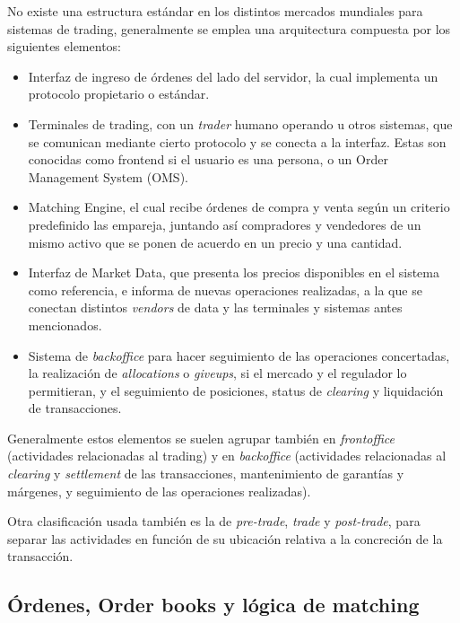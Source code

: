 No existe una estructura estándar en los distintos mercados mundiales para
sistemas de trading, generalmente se emplea una arquitectura compuesta por los
siguientes elementos:
\begin{itemize}
 \item Interfaz de ingreso de órdenes del lado del servidor, la cual implementa
un protocolo propietario o estándar.
 \item Terminales de trading, con un \emph{trader} humano operando u otros
sistemas, que se comunican mediante cierto protocolo y se conecta a la
interfaz. Estas son conocidas como frontend si el usuario es una persona, o un
Order Management System (OMS).
 \item Matching Engine, el cual recibe órdenes de compra y venta según un
criterio predefinido las empareja, juntando así compradores y vendedores de un
mismo activo que se ponen de acuerdo en un precio y una cantidad.
 \item Interfaz de Market Data, que presenta los precios disponibles en el
sistema como referencia, e informa de nuevas operaciones realizadas, a la que
se conectan distintos \emph{vendors} de data y las terminales y sistemas antes
mencionados.
 \item Sistema de \emph{backoffice} para hacer seguimiento de las operaciones
concertadas, la realización de \emph{allocations} o \emph{giveups}, si el
mercado y el regulador lo permitieran, y el seguimiento de posiciones, status
de \emph{clearing} y liquidación de transacciones.
\end{itemize}

Generalmente estos elementos se suelen agrupar también en \emph{frontoffice}
(actividades relacionadas al trading) y en \emph{backoffice} (actividades
relacionadas al \emph{clearing} y \emph{settlement} de las transacciones,
mantenimiento de garantías y márgenes, y seguimiento de las operaciones
realizadas).

Otra clasificación usada también es la de \emph{pre-trade}, \emph{trade} y
\emph{post-trade}, para separar las actividades en función de su ubicación
relativa a la concreción de la transacción.


\subsection{Órdenes, Order books y lógica de matching}

